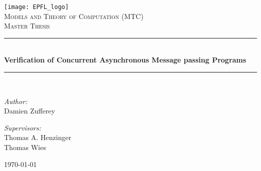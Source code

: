 \documentclass[a4paper]{report}
\numberwithin{algorithm}{chapter}
\begin{document}

\newtheorem{thm}{Theorem}[chapter]
\newtheorem*{thm*}{Theorem}
\newtheorem{cor}[thm]{Corollary}
\newtheorem{lem}[thm]{Lemma}

\theoremstyle{remark}
\newtheorem{rem}[thm]{Remark}

\theoremstyle{definition}
\newtheorem{define}[thm]{Definition}
\newtheorem{example}[thm]{Example}
\newtheorem{proposition}[thm]{Proposition}

\newcommand{\proglab}{\textsc{ProgLab}}
\newcommand{\scala}{\textsc{Scala}}
\newcommand{\dabs}{\emph{drop}-abstraction}
\newcommand{\iabs}{$\infty$-abstraction}
\newcommand{\pn}{Petri net}
\newcommand{\pns}{Petri nets}

\newcommand{\HRule}{\rule{\linewidth}{0.5mm}}

\newbox\subfigbox             %
\makeatletter
\newenvironment{subfloat}%
{\def\caption##1{\gdef\subcapsave{\relax##1}}%
    \let\subcapsave=\@empty %
        \let\sf@oldlabel=\label
        \def\label##1{\xdef\sublabsave{\noexpand\label{##1}}}%
        \let\sublabsave\relax    %
        \setbox\subfigbox\hbox
        \bgroup}%
{\egroup                %
    \let\label=\sf@oldlabel
        \subfigure[\subcapsave]{\box\subfigbox}}%
        \makeatother

\begin{titlepage}
\begin{center}
\texttt{[image: EPFL\_logo]}\\[1cm]
\textsc{\large Models and Theory of Computation (MTC)}\\[1.5cm]
\textsc{\Large Master Thesis}\\[0.5cm]
\HRule \\[0.4cm]
{ \huge \bfseries Verification of Concurrent Asynchronous Message passing Programs}\\[0.4cm]
\HRule \\[1.5cm]
\begin{minipage}{0.4\textwidth}
\begin{flushleft} \large
\emph{Author:}\\
Damien Zufferey
\end{flushleft}
\end{minipage}
\begin{minipage}{0.4\textwidth}
\begin{flushright} \large
\emph{Supervisors:} \\
Thomas A. Henzinger\\ Thomas Wies
\end{flushright}
\end{minipage}
\vfill
{\large \today}
\end{center}
\end{titlepage}
\end{document}
